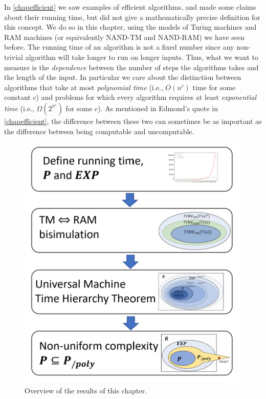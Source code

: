 In \cref{chapefficient} we saw examples of efficient algorithms, and
made some claims about their running time, but did not give a
mathematically precise definition for this concept. We do so in this
chapter, using the models of Turing machines and RAM machines (or
equivalently NAND-TM and NAND-RAM) we have seen before. The running time
of an algorithm is not a fixed number since any non-trivial algorithm
will take longer to run on longer inputs. Thus, what we want to measure
is the \emph{dependence} between the number of steps the algorithms
takes and the length of the input. In particular we care about the
distinction between algorithms that take at most \emph{polynomial time}
(i.e., \(O(n^c)\) time for some constant \(c\)) and problems for which
every algorithm requires at least \emph{exponential time} (i.e.,
\(\Omega(2^{n^c})\) for some \(c\)). As mentioned in Edmond's quote in
\cref{chapefficient}, the difference between these two can sometimes be
as important as the difference between being computable and
uncomputable.


\begin{figure}
\centering
\includegraphics[width=\textwidth, height=0.25\paperheight, keepaspectratio]{../figure/runtimeoverview.png}
\caption{Overview of the results of this chapter.}
\label{runtimeoverviewfig}
\end{figure}

